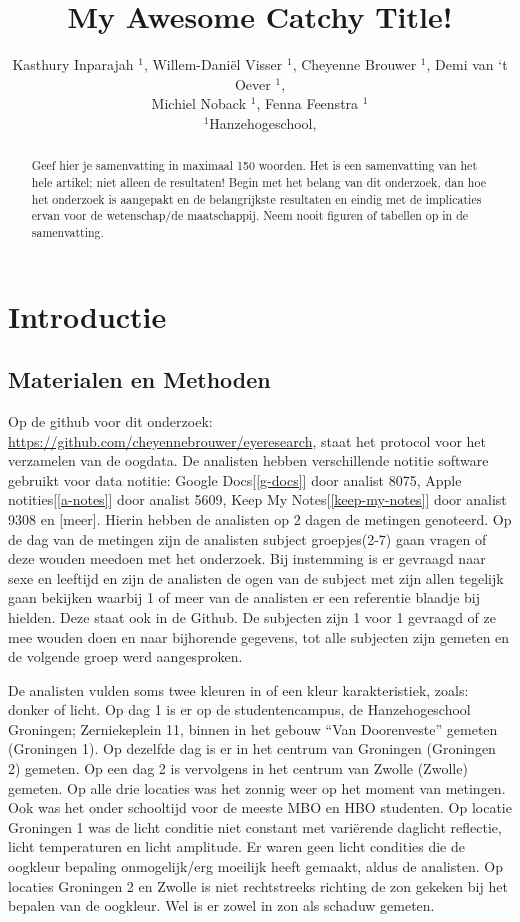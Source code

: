 \documentclass[
]{article}
\title{My Awesome Catchy Title!}
\author{Kasthury Inparajah \(^1\), Willem-Daniël Visser \(^1\), Cheyenne Brouwer \(^1\), Demi van `t Oever \(^1\),\\
Michiel Noback \(^1\), Fenna Feenstra \(^1\)\\
\(^1\)Hanzehogeschool,}
\date{}
\begin{document}
\maketitle
\begin{abstract}
Geef hier je samenvatting in maximaal 150 woorden. Het is een samenvatting van het hele artikel; niet alleen de resultaten! Begin met het belang van dit onderzoek, dan hoe het onderzoek is aangepakt en de belangrijkste resultaten en eindig met de implicaties ervan voor de wetenschap/de maatschappij. Neem nooit figuren of tabellen op in de samenvatting.
\end{abstract}

\hypertarget{introductie}{%
\section{Introductie}\label{introductie}}

\hypertarget{materialen-en-methoden}{%
\subsection{Materialen en Methoden}\label{materialen-en-methoden}}

Op de github voor dit onderzoek:
\url{https://github.com/cheyennebrouwer/eyeresearch}, staat het protocol
voor het verzamelen van de oogdata. De analisten hebben verschillende
notitie software gebruikt voor data notitie: Google Docs{[}\ref{g-docs}{]}
door analist 8075, Apple notities{[}\ref{a-notes}{]} door analist 5609,
Keep My Notes{[}\ref{keep-my-notes}{]} door analist 9308 en {[}meer{]}. Hierin
hebben de analisten op 2 dagen de metingen genoteerd. Op de dag van de
metingen zijn de analisten subject groepjes(2-7) gaan vragen of deze
wouden meedoen met het onderzoek. Bij instemming is er gevraagd naar
sexe en leeftijd en zijn de analisten de ogen van de subject met zijn
allen tegelijk gaan bekijken waarbij 1 of meer van de analisten er een
referentie blaadje bij hielden. Deze staat ook in de Github. De
subjecten zijn 1 voor 1 gevraagd of ze mee wouden doen en naar
bijhorende gegevens, tot alle subjecten zijn gemeten en de volgende
groep werd aangesproken.

De analisten vulden soms twee kleuren in of een kleur karakteristiek,
zoals: donker of licht. Op dag 1 is er op de studentencampus, de
Hanzehogeschool Groningen; Zerniekeplein 11, binnen in het gebouw ``Van
Doorenveste'' gemeten (Groningen 1). Op dezelfde dag is er in het centrum
van Groningen (Groningen 2) gemeten. Op een dag 2 is vervolgens in het
centrum van Zwolle (Zwolle) gemeten. Op alle drie locaties was het
zonnig weer op het moment van metingen. Ook was het onder schooltijd
voor de meeste MBO en HBO studenten. Op locatie Groningen 1 was de licht
conditie niet constant met variërende daglicht reflectie, licht
temperaturen en licht amplitude. Er waren geen licht condities die de
oogkleur bepaling onmogelijk/erg moeilijk heeft gemaakt, aldus de
analisten. Op locaties Groningen 2 en Zwolle is niet rechtstreeks
richting de zon gekeken bij het bepalen van de oogkleur. Wel is er zowel
in zon als schaduw gemeten.
\end{document}

